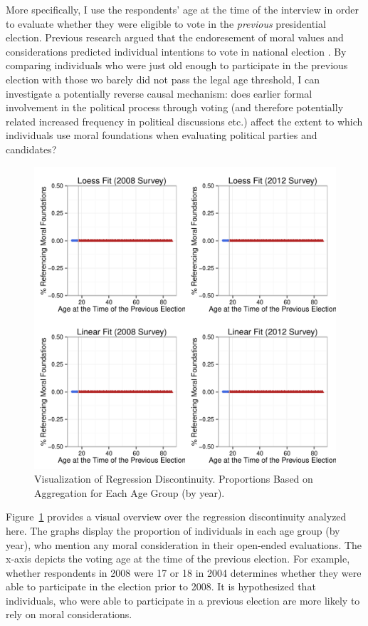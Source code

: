 \documentclass[12pt]{article}
\begin{document}
More specifically, I use the respondents' age at the time of the interview in order to evaluate whether they were eligible to vote in the \textit{previous} presidential election. Previous research argued that the endoresement of moral values and considerations predicted individual intentions to vote in national election \citep[c.f.][]{johnson2014ideology}. By comparing individuals who were just old enough to participate in the previous election with those wo barely did not pass the legal age threshold, I can investigate a potentially reverse causal mechanism: does earlier formal involvement in the political process through voting (and therefore potentially related increased frequency in political discussions etc.) affect the extent to which individuals use moral foundations when evaluating political parties and candidates?

\begin{figure}\centering
\includegraphics[scale=.9]{../calc/fig/rd1_overview.pdf}
\caption{Visualization of Regression Discontinuity. Proportions Based on Aggregation for Each Age Group (by year).}\label{fig:rd1_overview}
\end{figure}

Figure~\ref{fig:rd1_overview} provides a visual overview over the regression discontinuity analyzed here. The graphs display the proportion of individuals in each age group (by year), who mention any moral consideration in their open-ended evaluations. The x-axis depicts the voting age at the time of the previous election. For example, whether respondents in 2008 were 17 or 18 in 2004 determines whether they were able to participate in the election prior to 2008. It is hypothesized that individuals, who were able to participate in a previous election are more likely to rely on moral considerations.
\end{document}
